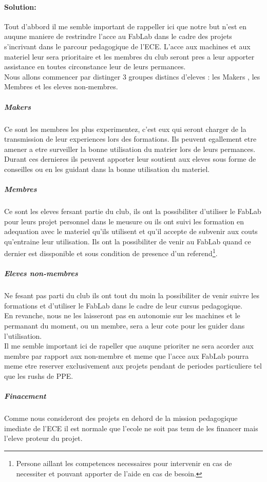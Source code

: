\documentclass[12pt,a4paper]{article}
\begin{document}
\paragraph{Solution: }
Tout d'abbord il me semble important de rappeller ici que notre but n'est en auqune maniere de restrindre l'acce au FabLab dans le cadre des projets s'incrivant dans le parcour pedagogique de l'ECE. L'acce aux machines et aux materiel leur sera prioritaire et les membres du club seront pres a leur apporter assistance en toutes circonstance leur de leurs permances.\\
Nous allons commencer par distinger 3 groupes distincs d'eleves : les Makers , les Membres et les eleves non-membres.\\
\subparagraph{Makers} Ce sont les membres les plus experimentez, c'est eux qui seront charger de la transmission de leur experiences lors des formations. Ils peuvent egallement etre amener a etre surveiller la bonne utilisation du matrier lors de leurs permances. Durant ces dernieres ils peuvent apporter leur soutient aux eleves sous forme de conseilles ou en les guidant dans la bonne utilisation du materiel.
\subparagraph{Membres} Ce sont les eleves fersant partie du club, ils ont la possibiliter d'utiliser le FabLab pour leurs projet personnel dans le meusure ou ils ont suivi les formation en adequation avec le materiel qu'ils utilisent et qu'il accepte de subvenir aux couts qu'entraine leur utilisation. Ils ont la possibiliter de venir au FabLab quand ce dernier est dissponible et sous condition de presence d'un referend\footnote{Persone aillant les competences necessaires pour intervenir en cas de necessiter et pouvant apporter de l'aide en cas de besoin.}. 
\subparagraph{Eleves non-membres}
Ne fesant pas parti du club ils ont tout du moin la possibiliter de venir suivre les formations et d'utiliser le FabLab dans le cadre de leur cursus pedagogique.\\ 
En revanche, nous ne les laisseront pas en autonomie sur les machines et le permanant du moment, ou un membre, sera a leur cote pour les guider dans l'utilisation.\\
Il me semble important ici de rapeller que auqune prioriter ne sera acorder aux membre par rapport aux non-membre et meme que l'acce aux FabLab pourra meme etre reserver exclusivement aux projets pendant de periodes particuliere tel que les rushs de PPE.
\vspace{1cm}
\subparagraph{Finacement}
Comme nous consideront des projets en dehord de la mission pedagogique imediate de l'ECE il est normale que l'ecole ne soit pas tenu de les financer mais l'eleve proteur du projet. \\
\end{document}
